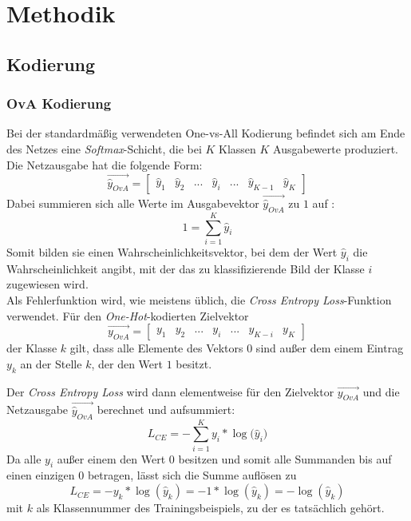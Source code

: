 \chapter{Methodik}
\label{ch:methodik}

\section{Kodierung}
\label{ch:methodik_kodierung}
\subsection{OvA Kodierung}
Bei der standardmäßig verwendeten One-vs-All Kodierung befindet sich am Ende des Netzes eine \textit{Softmax}-Schicht, die bei $K$ Klassen $K$ Ausgabewerte produziert.
Die Netzausgabe hat die folgende Form:
\[\overrightarrow{\widehat{y}_{OvA}} = \begin{bmatrix}
\widehat{y}_1 & \widehat{y}_2 & ... & \widehat{y}_i & ... & \widehat{y}_{K-1} & \widehat{y}_K
\end{bmatrix} \]
Dabei summieren sich alle Werte im Ausgabevektor $\overrightarrow{\widehat{y}_{OvA}}$ zu $1$ auf :
\[1 = \sum_{i=1}^K{\widehat{y}_i}\]
Somit bilden sie einen Wahrscheinlichkeitsvektor, bei dem der Wert $\widehat{y}_i$ die Wahrscheinlichkeit angibt, mit der das zu klassifizierende Bild der Klasse $i$ zugewiesen wird.\\

Als Fehlerfunktion wird, wie meistens üblich, die \textit{Cross Entropy Loss}-Funktion verwendet. Für den \textit{One-Hot}-kodierten Zielvektor
\[\overrightarrow{y_{OvA}} = \begin{bmatrix} y_1 & y_2 & ... & y_i & ... & y_{K-i} & y_K \end{bmatrix}\]
der Klasse $k$ gilt, dass alle Elemente des Vektors $0$ sind außer dem einem Eintrag $y_k$ an der Stelle $k$, der den Wert $1$ besitzt.


Der \textit{Cross Entropy Loss} wird dann elementweise für den Zielvektor $\overrightarrow{y_{OvA}}$ und die Netzausgabe $\overrightarrow{\widehat{y}_{OvA}}$ berechnet und aufsummiert:
\[L_{CE} = - \sum_{i=1}^K{y_i * \log{(\widehat{y}_i})}\]
Da alle $y_i$ außer einem den Wert $0$ besitzen und somit alle Summanden bis auf einen einzigen $0$ betragen, lässt sich die Summe auflösen zu 
\[L_{CE} = - y_k * \log{(\widehat{y}_k)} = -1 * \log{(\widehat{y}_k)} = - \log{(\widehat{y}_k)}\]
mit $k$ als Klassennummer des Trainingsbeispiels, zu der es tatsächlich gehört.

